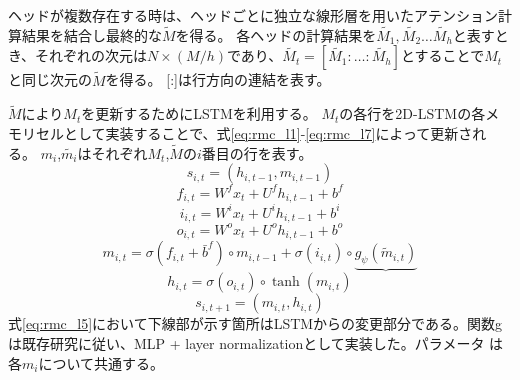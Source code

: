 ヘッドが複数存在する時は、ヘッドごとに独立な線形層を用いたアテンション計算結果を結合し最終的な$\tilde{M}$を得る。
各ヘッドの計算結果を$\tilde{M_1},\tilde{M_2}…\tilde{M_h}$と表すとき、それぞれの次元は$N\times (M/h)$であり、$\tilde{M_t}=[\tilde{M_1}: … :\tilde{M_h}]$とすることで$M_t$と同じ次元の$\tilde{M}$を得る。
[:]は行方向の連結を表す。

$\tilde{M}$により$M_t$を更新するためにLSTMを利用する。
$M_t$の各行を2D-LSTMの各メモリセルとして実装することで、式\ref{eq:rmc_l1}-\ref{eq:rmc_l7}によって更新される。
$m_i$,$\tilde{m_i}$はそれぞれ$M_t$,$\tilde{M}$の$i$番目の行を表す。
\begin{equation}\label{eq:rmc_l1}
	s_{i,t}=(h_{i,t-1},m_{i,t-1})
\end{equation}
\begin{equation}\label{eq:rmc_l2}
	f_{i,t}=W^f x_t +U^f h_{i,t-1}+b^f
\end{equation}
\begin{equation}\label{eq:rmc_l3}
	i_{i,t}=W^i x_t +U^i h_{i,t-1}+b^i
\end{equation}
\begin{equation}\label{eq:rmc_l4}
	o_{i,t}=W^o x_t +U^o h_{i,t-1}+b^o 
\end{equation}
\begin{equation}\label{eq:rmc_l5}
	m_{i,t}=\sigma(f_{i,t}+\bar{b}^f)\circ m_{i,t-1}+\sigma(i_{i,t})\circ \underbrace{g_\psi(\tilde{m}_{i,t})}
\end{equation}
\begin{equation}\label{eq:rmc_l6}
	h_{i,t}=\sigma(o_{i,t})\circ \tanh(m_{i,t})
\end{equation}
\begin{equation}\label{eq:rmc_l7}
	s_{i,t+1}=(m_{i,t},h_{i,t})
\end{equation}
式\ref{eq:rmc_l5}において下線部が示す箇所はLSTMからの変更部分である。関数gは既存研究\cite{rrnn}に従い、MLP + layer normalizationとして実装した。パラメータ は各$m_i$について共通する。
